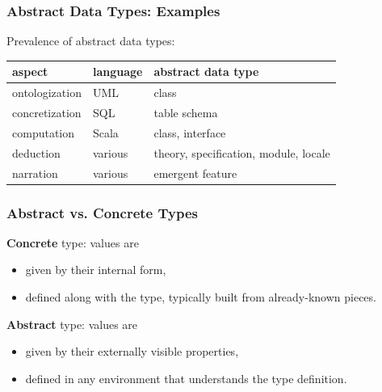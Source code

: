\begin{frame}\frametitle{Abstract Data Types: Examples}
Prevalence of abstract data types:

\begin{center}
\begin{tabular}{l|ll}
aspect & language & abstract data type \\
\hline
ontologization & UML & class \\
concretization & SQL & table schema \\
computation & Scala & class, interface \\
deduction & various & theory, specification, module, locale \\
narration & various & emergent feature
\end{tabular}
\end{center}

\end{frame}

\begin{frame}\frametitle{Abstract vs. Concrete Types}
\textbf{Concrete} type: values are
\begin{itemize}
\item given by their internal form,
\item defined along with the type, typically built from already-known pieces.
\end{itemize}

\textbf{Abstract} type: values are
\begin{itemize}
\item given by their externally visible properties,
\item defined in any environment that understands the type definition.
\end{itemize}
\end{frame}

